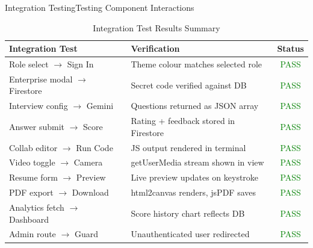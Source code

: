 \documentclass{beamer}
\begin{document}
\begin{frame}{Integration Testing}{Testing Component Interactions}
\scriptsize
\begin{table}
\centering
\begin{tabular}{|p{4cm}|p{4cm}|c|}
\hline
\textbf{Integration Test} & \textbf{Verification} & \textbf{Status} \\ \hline
Role select $\rightarrow$ Sign In & Theme colour matches selected role & \textcolor{green}{PASS} \\ \hline
Enterprise modal $\rightarrow$ Firestore & Secret code verified against DB & \textcolor{green}{PASS} \\ \hline
Interview config $\rightarrow$ Gemini & Questions returned as JSON array & \textcolor{green}{PASS} \\ \hline
Answer submit $\rightarrow$ Score & Rating + feedback stored in Firestore & \textcolor{green}{PASS} \\ \hline
Collab editor $\rightarrow$ Run Code & JS output rendered in terminal & \textcolor{green}{PASS} \\ \hline
Video toggle $\rightarrow$ Camera & getUserMedia stream shown in view & \textcolor{green}{PASS} \\ \hline
Resume form $\rightarrow$ Preview & Live preview updates on keystroke & \textcolor{green}{PASS} \\ \hline
PDF export $\rightarrow$ Download & html2canvas renders, jsPDF saves & \textcolor{green}{PASS} \\ \hline
Analytics fetch $\rightarrow$ Dashboard & Score history chart reflects DB & \textcolor{green}{PASS} \\ \hline
Admin route $\rightarrow$ Guard & Unauthenticated user redirected & \textcolor{green}{PASS} \\ \hline
\end{tabular}
\caption{Integration Test Results Summary}
\end{table}
\end{frame}
\end{document}
